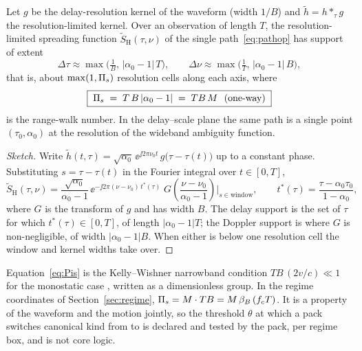 \begin{proposition}
\label{prop:rangewalk}
Let $g$ be the delay-resolution kernel of the waveform (width $1/B$) and $\tilde h = h *_\tau g$ the resolution-limited kernel. Over an observation of length $T$, the resolution-limited spreading function $\tilde S_{\mathrm H}(\tau,\nu)$ of the single path~\eqref{eq:pathop} has support of extent
\begin{equation}
  \Delta\tau \approx \max\!\Big(\tfrac{1}{B},\,|\alpha_0-1|\,T\Big),
  \qquad
  \Delta\nu \approx \max\!\Big(\tfrac{1}{T},\,|\alpha_0-1|\,B\Big),
\end{equation}
that is, about $\max(1,\Pi_{s})$ resolution cells along each axis, where
\begin{equation}
  \boxed{\;\Pi_{s} \;=\; T\,B\,|\alpha_0-1| \;=\; T B\,M \ \ \text{(one-way)}\;}
  \label{eq:Pis}
\end{equation}
is the range-walk number. In the delay--scale plane the same path is a single point $(\tau_0,\alpha_0)$ at the resolution of the wideband ambiguity function.
\end{proposition}

\begin{proof}[Sketch]
Write $\tilde h(t,\tau)=\sqrt{\alpha_0}\,\ee^{\jj2\pi\nu_0 t}\,g\big(\tau-\tau(t)\big)$ up to a constant phase. Substituting $s=\tau-\tau(t)$ in the Fourier integral over $t\in[0,T]$,
\[
  \tilde S_{\mathrm H}(\tau,\nu)
  = \frac{\sqrt{\alpha_0}}{\alpha_0-1}\,\ee^{-\jj 2\pi(\nu-\nu_0)\,t^\ast(\tau)}\;
    G\!\left(\frac{\nu-\nu_0}{\alpha_0-1}\right)\!\Big|_{s\in\text{window}},
  \qquad t^\ast(\tau)=\frac{\tau-\alpha_0\tau_0}{1-\alpha_0},
\]
where $G$ is the transform of $g$ and has width $B$. The delay support is the set of $\tau$ for which $t^\ast(\tau)\in[0,T]$, of length $|\alpha_0-1|T$; the Doppler support is where $G$ is non-negligible, of width $|\alpha_0-1|B$. When either is below one resolution cell the window and kernel widths take over.
\end{proof}

\begin{remark}
Equation~\eqref{eq:Pis} is the Kelly--Wishner narrowband condition $TB\,(2v/c)\ll1$ for the monostatic case \citep{kelly1965}, written as a dimensionless group. In the regime coordinates of Section~\ref{sec:regime}, $\Pi_{s} = M\cdot TB = M\,\beta_{B}\,(f_cT)$. It is a property of the waveform and the motion jointly, so the threshold $\theta$ at which a pack switches canonical kind from  to  is declared and tested by the pack, per regime box, and is not core logic.
\end{remark}

